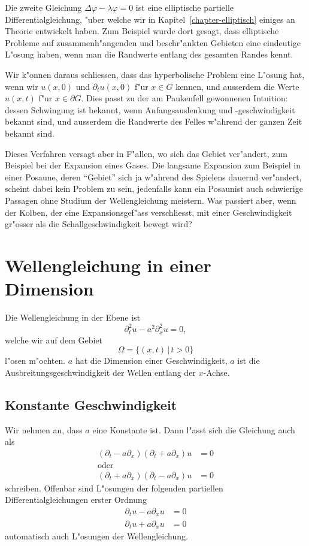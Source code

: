 Die zweite Gleichung $\Delta \varphi-\lambda\varphi=0$ ist eine
elliptische partielle Differentialgleichung, "uber welche wir
in Kapitel~\ref{chapter-elliptisch} einiges an Theorie entwickelt haben.
Zum Beispiel wurde dort gesagt, dass elliptische Probleme auf
zusammenh"angenden und beschr"ankten Gebieten eine eindeutige
L"osung haben, wenn man die Randwerte entlang des gesamten Randes
kennt.

Wir k"onnen daraus schliessen, dass das hyperbolische Problem eine
L"osung hat, wenn wir $u(x,0)$ und $\partial_tu(x,0)$ f"ur
$x\in G$ kennen, und ausserdem die Werte $u(x,t)$ f"ur $x\in\partial G$.
Dies passt zu der am Paukenfell gewonnenen Intuition: dessen Schwingung
ist bekannt, wenn Anfangsauslenkung und -geschwindigkeit bekannt sind,
und ausserdem die Randwerte des Felles w"ahrend der ganzen Zeit
bekannt sind.

Dieses Verfahren versagt aber in F"allen, wo sich das Gebiet ver"andert,
zum Beispiel bei der Expansion eines Gases.
Die langsame Expansion zum Beispiel in einer Posaune, deren ``Gebiet''
sich ja w"ahrend des Spielens dauernd ver"andert, scheint dabei kein
Problem zu sein, jedenfalls kann ein Posaunist auch schwierige Passagen
ohne Studium der Wellengleichung meistern.
Was passiert aber, wenn der
Kolben, der eine Expansionsgef"ass verschliesst, mit einer Geschwindigkeit
gr"osser als die Schallgeschwindigkeit bewegt wird? 

\section{Wellengleichung in einer Dimension}
Die Wellengleichung in der Ebene ist
\[
\partial_t^2u-a^2\partial_x^2u=0,
\]
welche wir auf dem Gebiet
\[
\Omega = \{(x,t) \,|\, t > 0\}
\]
l"osen m"ochten.
$a$ hat die Dimension einer Geschwindigkeit, $a$ ist die
Ausbreitungsgeschwindigkeit der Wellen entlang der $x$-Achse.

\subsection{Konstante Geschwindigkeit}
Wir nehmen an, dass $a$ eine Konstante ist. Dann l"asst sich die Gleichung
auch als
\begin{align*}
(\partial_t -a\partial_x)(\partial_t+a\partial_x)u&=0
\\
\text{oder}&
\\
(\partial_t +a\partial_x)(\partial_t-a\partial_x)u&=0
\end{align*}
schreiben.
Offenbar sind L"osungen der folgenden partiellen Differentialgleichungen
erster Ordnung
\begin{align}
\partial_t u-a\partial_x u&=0
\label{wellelinks}
\\
\partial_t u+a\partial_x u&=0
\label{wellerechts}
\end{align}
automatisch auch L"osungen der Wellengleichung.

